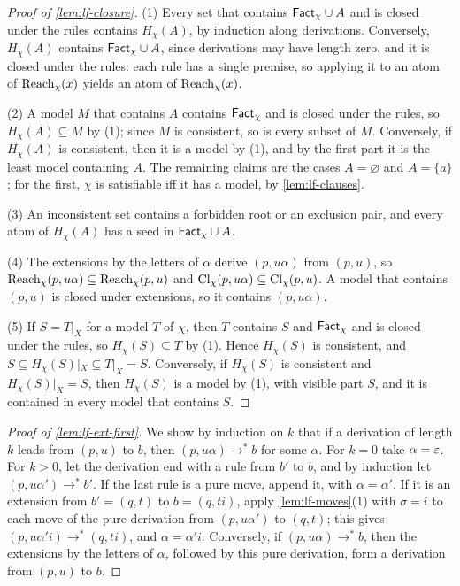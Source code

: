 \begin{proof}[Proof of \cref{lem:lf-closure}]
(1) Every set that contains $\mathsf{Fact}_\chi\cup A$ and is closed under the rules
contains $H_\chi(A)$, by induction along derivations. Conversely,
$H_\chi(A)$ contains $\mathsf{Fact}_\chi\cup A$, since derivations may have length
zero, and it is closed under the rules: each rule has a single premise, so
applying it to an atom of $\operatorname{Reach}_\chi(x)$ yields an atom of $\operatorname{Reach}_\chi(x)$.

(2) A model $M$ that contains $A$ contains $\mathsf{Fact}_\chi$ and is closed under
the rules, so $H_\chi(A)\subseteq M$ by (1); since $M$ is consistent, so is
every subset of $M$. Conversely, if $H_\chi(A)$ is consistent, then it is a
model by (1), and by the first part it is the least model containing $A$. The
remaining claims are the cases $A=\varnothing$ and $A=\{a\}$; for the first,
$\chi$ is satisfiable iff it has a model, by \cref{lem:lf-clauses}.

(3) An inconsistent set contains a forbidden root or an exclusion pair, and
every atom of $H_\chi(A)$ has a seed in $\mathsf{Fact}_\chi\cup A$.

(4) The extensions by the letters of $\alpha$ derive $(p,u\alpha)$ from
$(p,u)$, so $\operatorname{Reach}_\chi(p,u\alpha)\subseteq \operatorname{Reach}_\chi(p,u)$ and
$\operatorname{Cl}_\chi(p,u\alpha)\subseteq\operatorname{Cl}_\chi(p,u)$. A model that contains $(p,u)$ is
closed under extensions, so it contains $(p,u\alpha)$.

(5) If $S=T|_X$ for a model $T$ of $\chi$, then $T$ contains $S$ and
$\mathsf{Fact}_\chi$ and is closed under the rules, so $H_\chi(S)\subseteq T$ by (1).
Hence $H_\chi(S)$ is consistent, and
$S\subseteq H_\chi(S)|_X\subseteq T|_X=S$. Conversely, if $H_\chi(S)$ is
consistent and $H_\chi(S)|_X=S$, then $H_\chi(S)$ is a model by (1), with
visible part $S$, and it is contained in every model that contains $S$.
\end{proof}

\begin{proof}[Proof of \cref{lem:lf-ext-first}]
We show by induction on $k$ that if a derivation of length $k$ leads from
$(p,u)$ to $b$, then $(p,u\alpha)\to^*b$ for some $\alpha$. For $k=0$ take
$\alpha=\varepsilon$. For $k>0$, let the derivation end with a rule from $b'$ to
$b$, and by induction let $(p,u\alpha')\to^*b'$. If the last rule is a pure
move, append it, with $\alpha=\alpha'$. If it is an extension from
$b'=(q,t)$ to $b=(q,ti)$, apply \cref{lem:lf-moves}(1) with $\sigma=i$ to
each move of the pure derivation from $(p,u\alpha')$ to $(q,t)$; this gives
$(p,u\alpha'i)\to^*(q,ti)$, and $\alpha=\alpha'i$. Conversely, if
$(p,u\alpha)\to^*b$, then the extensions by the letters of $\alpha$, followed
by this pure derivation, form a derivation from $(p,u)$ to $b$.
\end{proof}

